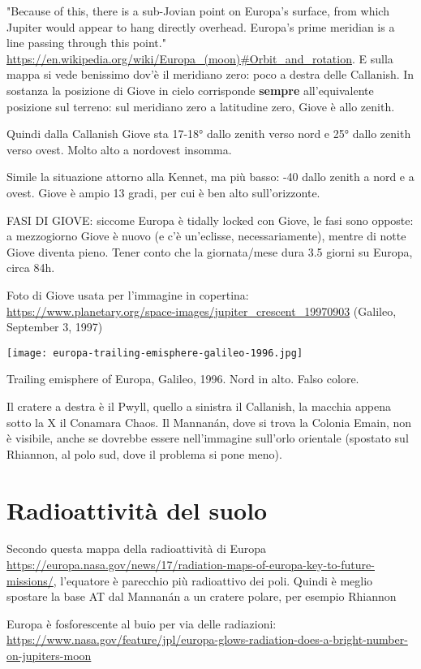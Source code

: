 \documentclass[a4paper,10pt,openany,oneside]{memoir}
\begin{document}
"Because of this, there is a sub-Jovian point on Europa's surface, from which Jupiter would appear to hang directly overhead. Europa's prime meridian is a line passing through this point." \url{https://en.wikipedia.org/wiki/Europa_(moon)#Orbit_and_rotation}. E sulla mappa si vede benissimo dov'è il meridiano zero: poco a destra delle Callanish. In sostanza la posizione di Giove in cielo corrisponde \textbf{sempre} all'equivalente posizione sul terreno: sul meridiano zero a latitudine zero, Giove è allo zenith.

Quindi dalla Callanish Giove sta 17-18° dallo zenith verso nord e 25° dallo zenith verso ovest. Molto alto a nordovest insomma.

Simile la situazione attorno alla Kennet, ma più basso: -40 dallo zenith a nord e a ovest. Giove è ampio 13 gradi, per cui è ben alto sull'orizzonte.

FASI DI GIOVE: siccome Europa è tidally locked con Giove, le fasi sono opposte: a mezzogiorno Giove è nuovo (e c'è un'eclisse, necessariamente), mentre di notte Giove diventa pieno. Tener conto che la giornata/mese dura 3.5 giorni su Europa, circa 84h.

Foto di Giove usata per l'immagine in copertina: \url{https://www.planetary.org/space-images/jupiter_crescent_19970903} (Galileo, September 3, 1997)
  

\texttt{[image: europa-trailing-emisphere-galileo-1996.jpg]}

Trailing emisphere of Europa, Galileo, 1996. Nord in alto. Falso colore. 

Il cratere a destra è il Pwyll, quello a sinistra il Callanish, la macchia appena sotto la X il Conamara Chaos.
Il Mannanán, dove si trova la Colonia Emain, non è visibile, anche se dovrebbe essere nell'immagine sull'orlo orientale (spostato sul Rhiannon, al polo sud, dove il problema si pone meno).



\section{Radioattività del suolo}

Secondo questa mappa della radioattività di Europa \url{https://europa.nasa.gov/news/17/radiation-maps-of-europa-key-to-future-missions/}, l'equatore è parecchio più radioattivo dei poli. Quindi è meglio spostare la base AT dal Mannanán a un cratere polare, per esempio Rhiannon

Europa è fosforescente al buio per via delle radiazioni: \url{https://www.nasa.gov/feature/jpl/europa-glows-radiation-does-a-bright-number-on-jupiters-moon}
\end{document}
